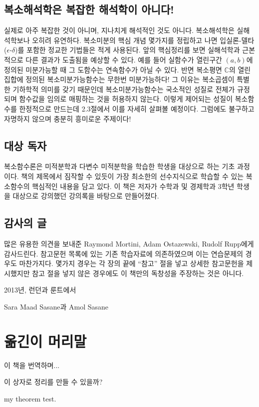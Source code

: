 \section*{복소해석학은 복잡한 해석학이 아니다!}


실제로 아주 복잡한 것이 아니며,  지나치게 해석적인 것도 아니다.
복소해석학은 실해석학보나 오히려 유연하다.
복소미분의 핵심 개념 몇가지를 정립하고 나면 
입실론-델타($\epsilon$-$\delta$)를 포함한 정교한 기법들은 적게 사용된다.
앞의 핵심정리를 보면 실해석학과 근본적으로 다른 결과가 도출됨을 예상할 수 있다.
예를 들어 실함수가 열린구간 $(a,b)$에 정의된 미분가능할 때 그 도함수는 연속함수가 아닐 수 있다.
반면 복소평면 $\mathbb C$의 열린집합에 정의된 복소미분가능함수는 
무한번 미분가능하다!
그 이유는 복소곱셈이 특별한 기하학적 의미를 갖기 때문인데
복소미분가능함수는 국소적인 성질로 전체가 규정되며 
함수값을 임의로 매핑하는 것을 허용하지 않는다.
이렇게 제어되는 성질이 복소함수를 한정적으로 만드는데
2.3절에서 이를 자세히 살펴볼 예정이다.
그럼에도 불구하고 자명하지 않으며 충분히 흥미로운 주제이다!

\section*{대상 독자}

복소함수론은 미적분학과 다변수 미적분학을 학습한 학생을 대상으로 하는 기초 과정이다.
책의 제목에서 짐작할 수 있듯이
가장 최소한의 선수지식으로 학습할 수 있는 복소함수의 핵심적인 내용을 담고 있다.
이 책은 저자가 수학과 및 경제학과 3학년 학생을 대상으로 강의했던 강의록을 
바탕으로  만들어졌다.


\section*{감사의 글}

 많은 유용한 의견을 보내준 
Raymond Mortini, Adam Ostazewski, Rudolf Rupp에게 감사드린다.
참고문헌 목록에 있는 기존 학습자료에 의존하였으며
이는 연습문제의 경우도 마찬가지다.
몇가지 경우는 각 장의 끝에 ``참고'' 절을 넣고 상세한 참고문헌을 제시했지만
참고 절을 넣지 않은 경우에도 이 책만의 독창성을 주장하는 것은 아니다.

\begin{flushright}
2013년, 런던과 룬트에서

Sara Maad Sasane과 Amol Sasane
\end{flushright}

\clearpage

\chapter*[옮긴이 머리말]{옮긴이 머리말}


이 책을 번역하며...

\begin{tcolorbox}[title={tcolorbox 연습}]
이 상자로 정리를 만들 수 있을까?
\end{tcolorbox}

\begin{mytheorem}
my theorem test.
\end{mytheorem}





